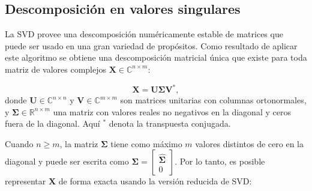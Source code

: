 %
%
%
%

\subsection*{Descomposición en valores singulares}\label{subsec:svd}

La SVD provee una descomposición numéricamente estable de matrices que puede ser usado en una gran variedad de propósitos. Como resultado de aplicar este algoritmo se obtiene una descomposición matricial única que existe para toda matriz de valores complejos $\mathbf{X} \in \mathbb{C}^{n \times m}$:

\begin{equation}
	\mathbf{X} = \mathbf{U} \mathbf{\Sigma} \mathbf{V}^*,
\end{equation}
donde $\mathbf{U} \in \mathbb{C}^{n \times n}$ y $\mathbf{V} \in \mathbb{C}^{m \times m}$ son matrices unitarias con columnas ortonormales, y $\mathbf{\Sigma} \in \mathbb{R}^{n \times m}$ una matriz con valores reales no negativos en la diagonal y ceros fuera de la diagonal. Aquí $^*$ denota la transpuesta conjugada.

Cuando $n \ge m$, la matriz $\mathbf{\Sigma}$ tiene como máximo $m$ valores distintos de cero en la diagonal y puede ser escrita como $\mathbf{\Sigma} = \begin{bmatrix}\hat{\mathbf{\Sigma}} \\ 0\end{bmatrix}$. Por lo tanto, es posible representar $\mathbf{X}$ de forma exacta usando la versión reducida de SVD:

